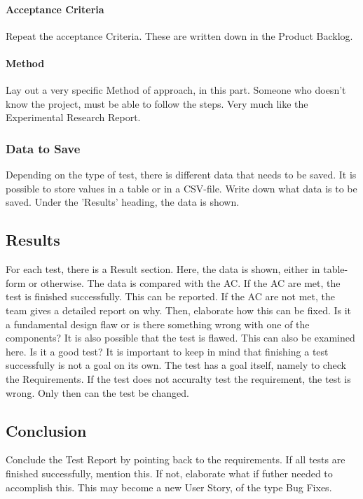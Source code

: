 \documentclass[10pt]{report}
\begin{document}
\paragraph{Acceptance Criteria}

Repeat the acceptance Criteria. These are written down in the Product Backlog.

\paragraph{Method}

Lay out a very specific Method of approach, in this part. Someone who doesn't know the project, must be able to follow the steps. Very much like the Experimental Research Report.

\subsubsection{Data to Save}

Depending on the type of test, there is different data that needs to be saved. It is possible to store values in a table or in a CSV-file. Write down what data is to be saved. Under the 'Results' heading, the data is shown.

\subsection{Results}

For each test, there is a Result section. Here, the data is shown, either in table-form or otherwise. The data is compared with the AC. If the AC are met, the test is finished successfully. This can be reported. If the AC are not met, the team gives a detailed report on why. Then, elaborate how this can be fixed. Is it a fundamental design flaw or is there something wrong with one of the components? It is also possible that the test is flawed. This can also be examined here. Is it a good test? It is important to keep in mind that finishing a test successfully is not a goal on its own. The test has a goal itself, namely to check the Requirements. If the test does not accuralty test the requirement, the test is wrong. Only then can the test be changed.

\subsection{Conclusion}

Conclude the Test Report by pointing back to the requirements. If all tests are finished successfully, mention this. If not, elaborate what if futher needed to accomplish this. This may become a new User Story, of the type Bug Fixes.
\end{document}

